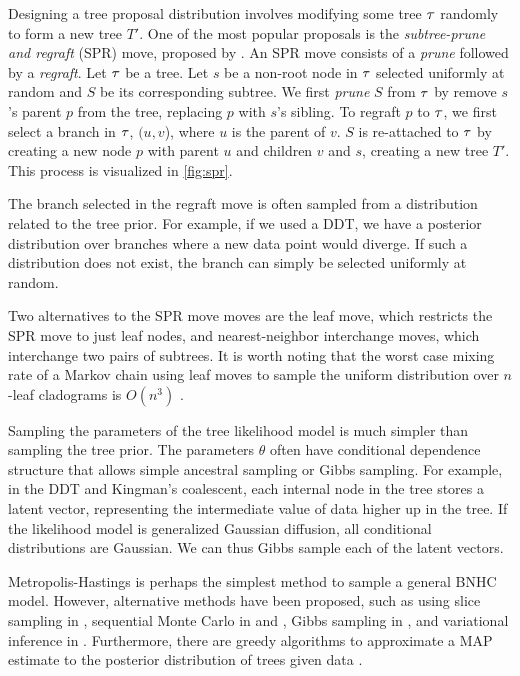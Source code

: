 Designing a tree proposal distribution
involves modifying some tree $\tau$ 
randomly to form a new tree $T'$.
One of the most popular proposals
is the \emph{subtree-prune and regraft} (SPR) move, proposed by \citet{Swofford1990}.
An SPR move consists of a \emph{prune} followed by a \emph{regraft}.
Let $\tau$ be a tree.
Let $s$ be a non-root
node in $\tau$ selected uniformly at random
and $S$ be its corresponding subtree.
We first \emph{prune}
$S$ from $\tau$ by
remove $s$'s parent $p$ from the tree,
replacing $p$ with $s$'s sibling.
To regraft $p$ to $\tau$,
we first select a branch in $\tau$,
$(u, v$), where $u$ is the parent of $v$.
$S$ is re-attached to $\tau$
by creating a new node $p$
with parent $u$ and children $v$ and $s$,
creating a new tree $T'$.
This process is visualized in \autoref{fig:spr}.

The branch selected in the regraft move
is often sampled from a distribution
related to the tree prior.
For example, if we used a DDT,
we have a posterior distribution
over branches where a new data point would 
diverge. If such a distribution
does not exist, the branch can simply
be selected uniformly at random.

Two alternatives to the SPR move
moves are the leaf move,
which restricts the SPR move
to just leaf nodes,
and nearest-neighbor interchange
moves, which interchange
two pairs of subtrees.
It is worth noting
that 
the worst case mixing rate of
a Markov chain using
leaf moves to sample
the uniform distribution over
$n$-leaf cladograms is $O(n^3)$ \citet{Aldous2000}.

Sampling the parameters of 
the tree likelihood model is much simpler
than sampling the tree prior.
The parameters $\theta$ often
have conditional dependence
structure that allows simple
ancestral sampling or Gibbs sampling.
For example, in the DDT and Kingman's coalescent,
each internal node in the tree stores
a latent vector, representing the intermediate value
of data higher up in the tree.
If the likelihood model is
generalized Gaussian diffusion,
all conditional distributions are Gaussian.
We can thus Gibbs sample each of the
latent vectors.

Metropolis-Hastings is perhaps the
simplest method to sample a general
BNHC model. However, alternative methods
have been proposed,
such as using slice sampling in \citet{Adams2010},
sequential Monte Carlo in \citet{Teh2009} and \citet{Hu2013},
Gibbs sampling in \citet{Blei2010},
and variational inference in \citet{Paisley2014}.
Furthermore, there are greedy algorithms
to approximate a MAP estimate
to the posterior distribution
of trees given data \citep{Teh2009, Hu2013}.
